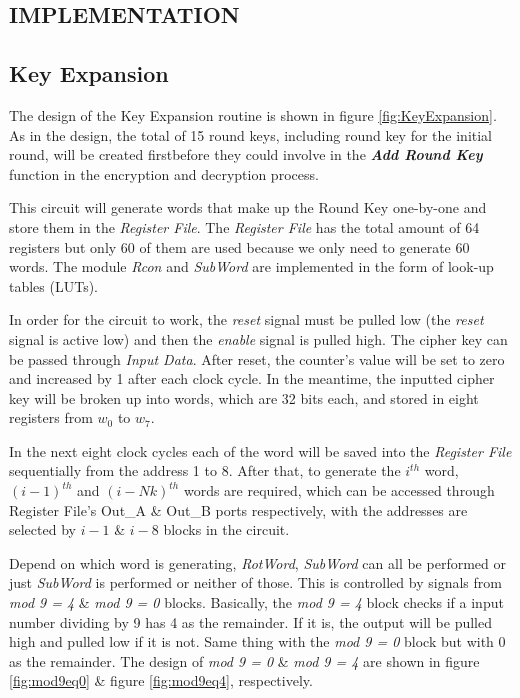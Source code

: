 \documentclass[a4paper, 10pt]{article}
\begin{document}
        \begin{multicols}{2}
        \section{IMPLEMENTATION}

            \subsection{Key Expansion}

            The design of the Key Expansion routine is shown in figure \ref{fig:KeyExpansion}. As in the design, the total of 15 round keys, including round key for the initial round, will be created firstbefore they could involve in the \textbf{\textit{Add Round Key}} function in the encryption and decryption process.
            
            This circuit will generate words that make up the Round Key one-by-one and store them in the \textit{Register File}. The \textit{Register File} has the total amount of 64 registers but only 60 of them are used because we only need to generate 60 words. The module \textit{Rcon} and \textit{SubWord} are implemented in the form of look-up tables (LUTs).

            In order for the circuit to work, the \textit{reset} signal must be pulled low (the \textit{reset} signal is active low) and then the \textit{enable} signal is pulled high. The cipher key can be passed through \textit{Input Data}. After reset, the counter's value will be set to zero and increased by 1 after each clock cycle. In the meantime, the inputted cipher key will be broken up into words, which are 32 bits each, and stored in eight registers from $w_{0}$ to $w_{7}$.
            
            In the next eight clock cycles each of the word will be saved into the \textit{Register File} sequentially from the address 1 to 8. After that, to generate the $i^{th}$ word, $(i-1)^{th}$ and $(i-Nk)^{th}$ words are required, which can be accessed through Register File's Out\_A \& Out\_B ports respectively, with the addresses are selected by $i-1$ \& $i-8$ blocks in the circuit.
            
            Depend on which word is generating, \textit{RotWord}, \textit{SubWord} can all be performed or just \textit{SubWord} is performed or neither of those. This is controlled by signals from \textit{mod 9 = 4} \& \textit{mod 9 = 0} blocks. Basically, the \textit{mod 9 = 4} block checks if a input number dividing by 9 has 4 as the remainder. If it is, the output will be pulled high and pulled low if it is not. Same thing with the \textit{mod 9 = 0} block but with 0 as the remainder. The design of \textit{mod 9 = 0} \& \textit{mod 9 = 4} are shown in figure \ref{fig:mod9eq0} \& figure \ref{fig:mod9eq4}, respectively.
            

\end{multicols}
\end{document}
